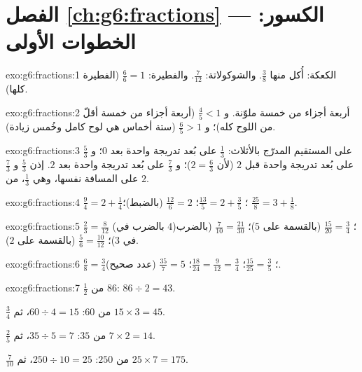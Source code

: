 \section*{الفصل \ref{ch:g6:fractions} --- الكسور: الخطوات الأولى}

\begin{solution}{exo:g6:fractions:1}
الكعكة: أُكل منها $\frac38$. \quad والشوكولاتة: $\frac{7}{12}$. \quad
والفطيرة: $\frac66 = 1$ (الفطيرة كلها).
\end{solution}

\begin{solution}{exo:g6:fractions:2}
أربعة أجزاء من خمسة ملوّنة. و $\frac45 < 1$ (أربعة أجزاء من
خمسة أقلّ من اللوح كله)؛ و $\frac65 > 1$ (ستة أخماس هي لوح
كامل وخُمس زيادة).
\end{solution}

\begin{solution}{exo:g6:fractions:3}
على المستقيم المدرّج بالأثلاث: $\frac13$ على بُعد تدريجة واحدة بعد $0$؛
و $\frac53$ على بُعد تدريجة واحدة قبل $2$ (لأن $2 = \frac63$)؛ و $\frac73$ على
بُعد تدريجة واحدة بعد $2$. إذن $\frac53$ و $\frac73$ على المسافة نفسها،
وهي $\frac13$، من $2$.
\end{solution}

\begin{solution}{exo:g6:fractions:4}
$\frac94 = 2 + \frac14$؛ \quad
$\frac{13}{5} = 2 + \frac35$؛ \quad
$\frac{12}{6} = 2$ (بالضبط)؛ \quad
$\frac{25}{8} = 3 + \frac18$.
\end{solution}

\begin{solution}{exo:g6:fractions:5}
$\frac23 = \frac{8}{12}$ (بالضرب في $4$)؛ \quad
$\frac{15}{20} = \frac34$ (بالقسمة على $5$)؛ \quad
$\frac{7}{10} = \frac{21}{30}$ (بالضرب في $3$)؛ \quad
$\frac56 = \frac{10}{12}$ (بالقسمة على $2$).
\end{solution}

\begin{solution}{exo:g6:fractions:6}
$\frac68 = \frac34$؛ \quad
$\frac{15}{25} = \frac35$؛ \quad
$\frac{18}{24} = \frac{9}{12} = \frac34$؛ \quad
$\frac{35}{7} = 5$ (عدد صحيح).
\end{solution}

\begin{solution}{exo:g6:fractions:7}
$\frac12$ من $86$: $86 \div 2 = 43$.

$\frac34$ من $60$: $60 \div 4 = 15$، ثم $15 \times 3 = 45$.

$\frac25$ من $35$: $35 \div 5 = 7$، ثم $7 \times 2 = 14$.

$\frac{7}{10}$ من $250$: $250 \div 10 = 25$، ثم $25 \times 7 = 175$.
\end{solution}

